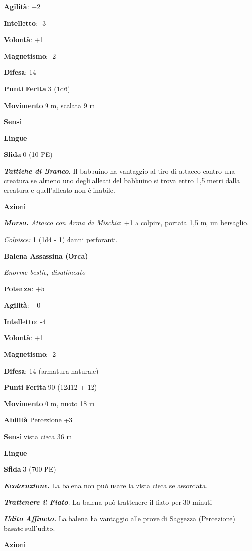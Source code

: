 \begin{multicols}{2}
\textbf{Agilità}: +2

\textbf{Intelletto}: -3

\textbf{Volontà}: +1

\textbf{Magnetismo}: -2

\textbf{Difesa}: 14

\textbf{Punti Ferita} 3 (1d6)

\textbf{Movimento} 9 m, scalata 9 m

\textbf{Sensi} 

\textbf{Lingue} -

\textbf{Sfida} 0 (10 PE)

\emph{\textbf{Tattiche di Branco.}} Il babbuino ha vantaggio al tiro di
attacco contro una creatura se almeno uno degli alleati del babbuino si
trova entro 1,5 metri dalla creatura e quell'alleato non è inabile.

\textbf{Azioni}

\emph{\textbf{Morso.} Attacco con Arma da Mischia}: +1 a colpire,
portata 1,5 m, un bersaglio.

\emph{Colpisce:} 1 (1d4 - 1) danni perforanti.



\textbf{Balena Assassina (Orca)}

\emph{Enorme bestia, disallineato}

\textbf{Potenza}: +5

\textbf{Agilità}: +0

\textbf{Intelletto}: -4

\textbf{Volontà}: +1

\textbf{Magnetismo}: -2

\textbf{Difesa}: 14 (armatura naturale)

\textbf{Punti Ferita} 90 (12d12 + 12)

\textbf{Movimento} 0 m, nuoto 18 m

\textbf{Abilità} Percezione +3

\textbf{Sensi} vista cieca 36 m

\textbf{Lingue} -

\textbf{Sfida} 3 (700 PE)

\emph{\textbf{Ecolocazione.}} La balena non può usare la vista cieca se
assordata.

\emph{\textbf{Trattenere il Fiato.}} La balena può trattenere il fiato
per 30 minuti

\emph{\textbf{Udito Affinato.}} La balena ha vantaggio alle prove di
Saggezza (Percezione) basate sull'udito.

\textbf{Azioni}


\end{multicols}
